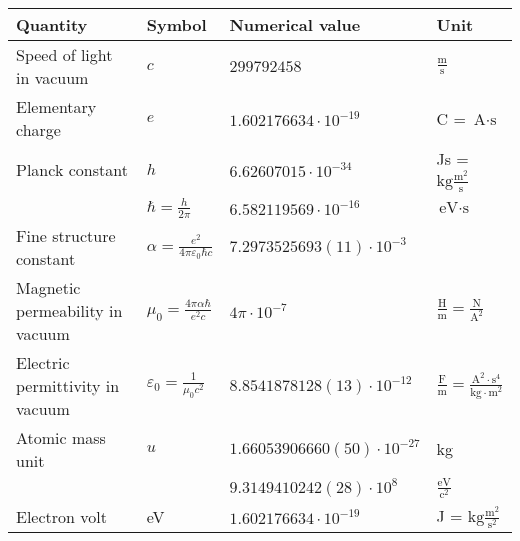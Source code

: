 \begin{tabular}{llll}
\hline
Quantity                        & Symbol & Numerical value                              & Unit \\
\hline
Speed of light in vacuum        & $c$             & $299792458$                         & $\frac{\text{m}}{\text{s}}$                  \\
Elementary charge               & $e$             & $1.602176634 \cdot 10^{-19}$        & C = $\text{A}\cdot\text{s}$                  \\
Planck constant                 & $h$             & $6.62607015 \cdot 10^{-34}$         & Js = $\text{kg}\frac{\text{m}^2}{\text{s}}$  \\
                                & $\hbar = \frac{h}{2\pi}$ 
                                                  & $6.582119569 \cdot 10^{-16}$        & $\text{eV} \cdot \text{s}$                   \\
Fine structure constant         & $\alpha = \frac{e^2}{4\pi \varepsilon_0 \hbar c}$     
                                                  & $7.2973525693(11) \cdot 10^{-3}$    &   \\
Magnetic permeability in vacuum & $\mu_0 = \frac{4\pi \alpha \hbar}{e^2 c}$ 
                                                  & $4\pi \cdot 10^{-7}$   & $\frac{\text{H}}{\text{m}} = \frac{\text{N}}{\text{A}^2}$ \\
Electric permittivity in vacuum & $\varepsilon_0 = \frac{1}{\mu_0 c^2}$ 
                                                  & $8.8541878128(13) \cdot 10^{-12}$   & $\frac{\text{F}}{\text{m}} = \frac{\text{A}^2\cdot\text{s}^4}{\text{kg}\cdot\text{m}^2}$ \\
\hline
Atomic mass unit                & $u$             & $1.66053906660(50) \cdot 10^{-27}$  & kg                                           \\
                                &                 & $9.3149410242(28) \cdot 10^{8}$     & $\frac{\text{eV}}{\text{c}^2}$               \\
Electron volt                   &  eV             & $1.602176634 \cdot 10^{-19}$        & J = $\text{kg}\frac{\text{m}^2}{\text{s}^2}$ \\
\hline
\end{tabular}